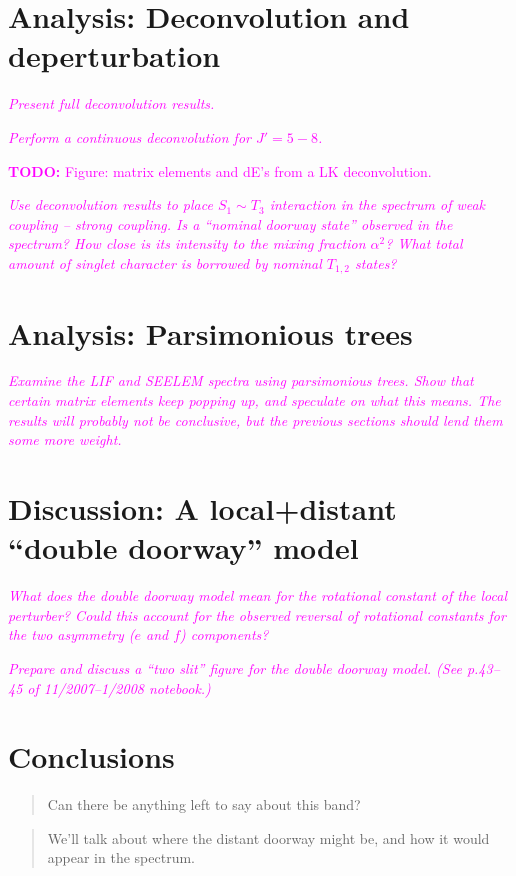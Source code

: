 \documentclass[12pt]{mitthesis}
\newcommand{\TODO} [1]{\textcolor{magenta}{\textbf{TODO:} #1}}
\newcommand{\POINT}[1]{\textcolor{magenta}{\emph{#1}}}
\begin{document}
\section{Analysis: Deconvolution and deperturbation}

\POINT{Present full deconvolution results.}

\POINT{Perform a continuous deconvolution for $J'=5-8$.}

\TODO{Figure: matrix elements and dE's from a LK deconvolution.}

\POINT{Use deconvolution results to place $S_1 \sim T_3$ interaction
  in the spectrum of weak coupling -- strong coupling. Is a ``nominal
  doorway state'' observed in the spectrum?  How close is its
  intensity to the mixing fraction $\alpha^2$?  What total amount of
  singlet character is borrowed by nominal $T_{1,2}$ states?}

\section{Analysis: Parsimonious trees}

\POINT{Examine the LIF and SEELEM spectra using parsimonious trees.
  Show that certain matrix elements keep popping up, and speculate on
  what this means.  The results will probably not be conclusive, but
  the previous sections should lend them some more weight.}

\section{Discussion: A local+distant ``double doorway'' model}

\POINT{What does the double doorway model mean for the rotational
  constant of the local perturber?  Could this account for the
  observed reversal of rotational constants for the two asymmetry ($e$
  and $f$) components?}

\POINT{Prepare and discuss a ``two slit'' figure for the double
  doorway model. (See p.43--45 of 11/2007--1/2008 notebook.)}

\section{Conclusions}

\begin{quote}
  Can there be anything left to say about this band?
\end{quote}

\begin{quote}
  We'll talk about where the distant doorway might be, and how it
  would appear in the spectrum.
\end{quote}
\end{document}
